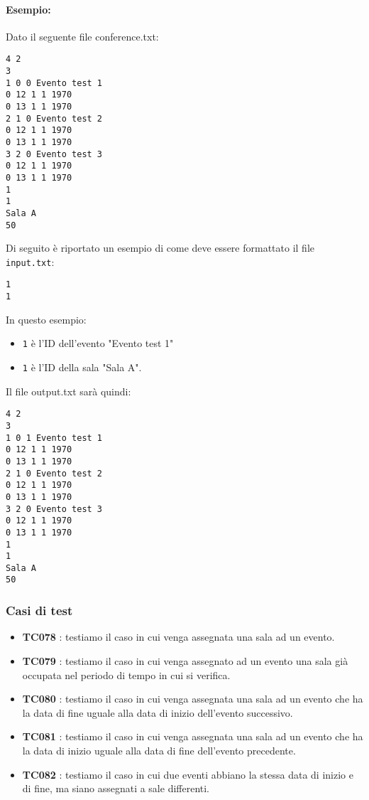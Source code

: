 \documentclass[11pt]{scrartcl} %
\begin{document}
\paragraph{Esempio:}
Dato il seguente file conference.txt:
\begin{lstlisting}
4 2
3
1 0 0 Evento test 1
0 12 1 1 1970
0 13 1 1 1970
2 1 0 Evento test 2
0 12 1 1 1970
0 13 1 1 1970
3 2 0 Evento test 3
0 12 1 1 1970
0 13 1 1 1970
1
1
Sala A
50
\end{lstlisting}

Di seguito è riportato un esempio di come deve essere formattato il file \texttt{input.txt}:

\begin{lstlisting}
1
1
\end{lstlisting}

In questo esempio:
\begin{itemize}
    \item \texttt{1} è l'ID dell'evento "Evento test 1"
    \item \texttt{1} è l'ID della sala "Sala A".
\end{itemize}
Il file output.txt sarà quindi:

\begin{lstlisting}
4 2
3
1 0 1 Evento test 1
0 12 1 1 1970
0 13 1 1 1970
2 1 0 Evento test 2
0 12 1 1 1970
0 13 1 1 1970
3 2 0 Evento test 3
0 12 1 1 1970
0 13 1 1 1970
1
1
Sala A
50
\end{lstlisting}


\subsubsection{Casi di test}

\begin{itemize}


	\item \textbf{TC078} : testiamo il caso in cui venga assegnata una sala ad un evento.

	\item \textbf{TC079} : testiamo il caso in cui venga assegnato ad un evento una sala già occupata nel periodo di tempo in cui si verifica.

	\item \textbf{TC080} : testiamo il caso in cui venga assegnata una sala ad un evento che ha la data di fine uguale alla data di inizio dell'evento successivo.

	\item \textbf{TC081} : testiamo il caso in cui venga assegnata una sala ad un evento che ha la data di inizio uguale alla data di fine dell'evento precedente.

	\item \textbf{TC082} : testiamo il caso in cui due eventi abbiano la stessa data di inizio e di fine, ma siano assegnati a sale differenti.


\end{itemize}
\end{document}
